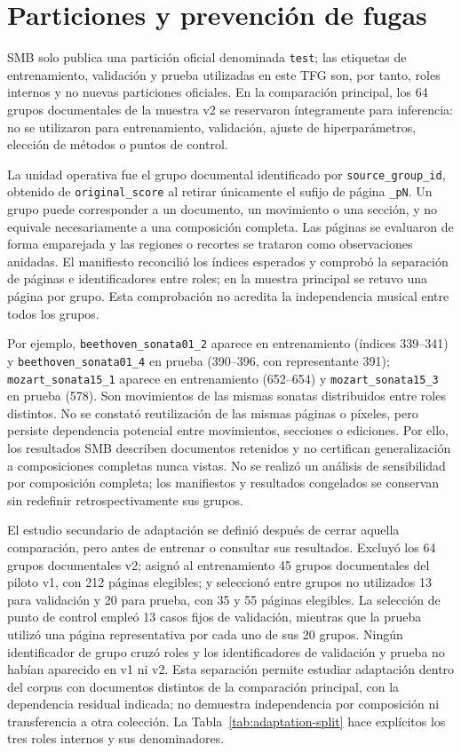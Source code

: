 \section{Particiones y prevención de fugas}
\label{sec:smb-grouping}
SMB solo publica una partición oficial denominada \texttt{test}; las etiquetas de entrenamiento,
validación y prueba utilizadas en este TFG son, por tanto, roles internos y no nuevas particiones
oficiales. En la comparación principal, los 64 grupos documentales de la muestra v2 se reservaron íntegramente
para inferencia: no se utilizaron para entrenamiento, validación, ajuste de hiperparámetros,
elección de métodos o puntos de control.

La unidad operativa fue el grupo documental identificado por \texttt{source\_group\_id},
obtenido de \texttt{original\_score} al retirar únicamente el sufijo de página \texttt{\_pN}.
Un grupo puede corresponder a un documento, un movimiento o una sección, y no equivale
necesariamente a una composición completa. Las páginas se evaluaron de forma emparejada y las
regiones o recortes se trataron como observaciones anidadas. El manifiesto reconcilió los índices
esperados y comprobó la separación de páginas e identificadores entre roles; en la muestra
principal se retuvo una página por grupo. Esta comprobación no acredita la independencia musical
entre todos los grupos.

Por ejemplo, \texttt{beethoven\_sonata01\_2} aparece en entrenamiento (índices 339--341) y
\texttt{beethoven\_sonata01\_4} en prueba (390--396, con representante 391);
\texttt{mozart\_sonata15\_1} aparece en entrenamiento (652--654) y
\texttt{mozart\_sonata15\_3} en prueba (578). Son movimientos de las mismas sonatas
distribuidos entre roles distintos. No se constató reutilización de las mismas páginas o píxeles,
pero persiste dependencia potencial entre movimientos, secciones o ediciones. Por ello, los
resultados SMB describen documentos retenidos y no certifican generalización a composiciones
completas nunca vistas. No se realizó un análisis de sensibilidad por composición completa;
los manifiestos y resultados congelados se conservan sin redefinir retrospectivamente sus grupos.

El estudio secundario de adaptación se definió después de cerrar aquella comparación, pero antes
de entrenar o consultar sus resultados. Excluyó los 64 grupos documentales v2; asignó al entrenamiento 45 grupos documentales
del piloto v1, con 212 páginas elegibles; y seleccionó entre grupos no utilizados 13 para validación y 20
para prueba, con 35 y 55 páginas elegibles. La selección de punto de control empleó 13 casos fijos
de validación, mientras que la prueba utilizó una página representativa por cada uno de sus 20
grupos. Ningún identificador de grupo cruzó roles y los identificadores de validación y prueba no
habían aparecido en v1 ni v2. Esta separación permite estudiar adaptación dentro del corpus con
documentos distintos de la comparación principal, con la dependencia residual indicada; no
demuestra independencia por composición ni transferencia a otra colección.
La Tabla~\ref{tab:adaptation-split} hace explícitos los tres roles internos y sus denominadores.

